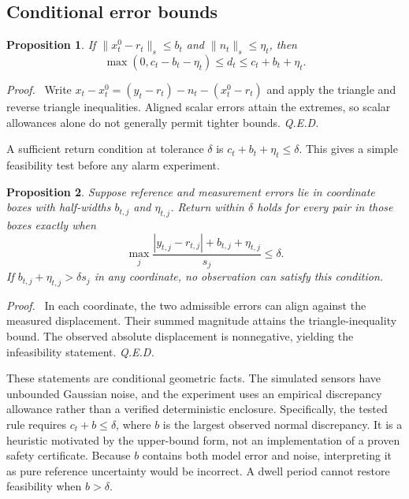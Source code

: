 \documentclass[11pt]{article}
\newtheorem{proposition}{Proposition}
\newenvironment{proof}{\par\noindent\textit{Proof.}\ }{\hfill\textit{Q.E.D.}\par}
\begin{document}
\subsection{Conditional error bounds}
\begin{proposition}
If $\|x_t^0-r_t\|_s\le b_t$ and $\|n_t\|_s\le\eta_t$, then
\begin{equation}
 \max(0,c_t-b_t-\eta_t)\le d_t\le c_t+b_t+\eta_t.
 \label{eq:bound}
\end{equation}
\end{proposition}
\begin{proof}
Write $x_t-x_t^0=(y_t-r_t)-n_t-(x_t^0-r_t)$ and apply the triangle and reverse triangle inequalities. Aligned scalar errors attain the extremes, so scalar allowances alone do not generally permit tighter bounds.
\end{proof}

A sufficient return condition at tolerance $\delta$ is $c_t+b_t+\eta_t\le\delta$. This gives a simple feasibility test before any alarm experiment.
\begin{proposition}
Suppose reference and measurement errors lie in coordinate boxes with half-widths $b_{t,j}$ and $\eta_{t,j}$. Return within $\delta$ holds for every pair in those boxes exactly when
\begin{equation}
 \max_j\frac{|y_{t,j}-r_{t,j}|+b_{t,j}+\eta_{t,j}}{s_j}\le\delta.
 \label{eq:box}
\end{equation}
If $b_{t,j}+\eta_{t,j}>\delta s_j$ in any coordinate, no observation can satisfy this condition.
\end{proposition}
\begin{proof}
In each coordinate, the two admissible errors can align against the measured displacement. Their summed magnitude attains the triangle-inequality bound. The observed absolute displacement is nonnegative, yielding the infeasibility statement.
\end{proof}

These statements are conditional geometric facts. The simulated sensors have unbounded Gaussian noise, and the experiment uses an empirical discrepancy allowance rather than a verified deterministic enclosure. Specifically, the tested rule requires $c_t+b\le\delta$, where $b$ is the largest observed normal discrepancy. It is a heuristic motivated by the upper-bound form, not an implementation of a proven safety certificate. Because $b$ contains both model error and noise, interpreting it as pure reference uncertainty would be incorrect. A dwell period cannot restore feasibility when $b>\delta$.
\end{document}
